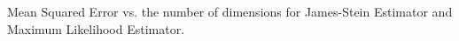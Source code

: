 
  Mean Squared Error vs. the number of dimensions for James-Stein Estimator and Maximum Likelihood Estimator.